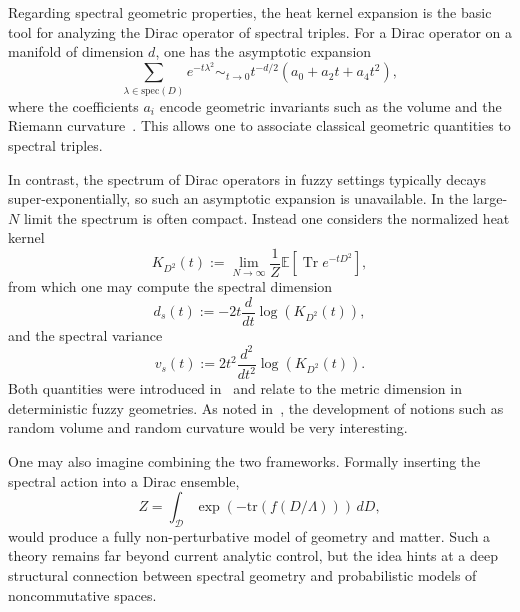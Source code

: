 \documentclass[11pt]{article}
\theoremstyle{plain}
\DeclareMathOperator{\tr}{Tr}
\begin{document}
\medskip

Regarding spectral geometric properties, the heat kernel expansion is the basic tool for
analyzing the Dirac operator of spectral triples.  
For a Dirac operator on a manifold of dimension $d$, one has the asymptotic expansion
\begin{equation*}
\sum_{\lambda \in \text{spec}(D)} e^{-t\lambda^2}
   \sim_{t \rightarrow 0} t^{-d/2}(a_{0}+a_{2}t + a_{4}t^2),
\end{equation*}
where the coefficients $a_i$ encode geometric invariants such as the volume and the
Riemann curvature~\cite{Gilkey}.  
This allows one to associate classical geometric quantities to spectral triples.

In contrast, the spectrum of Dirac operators in fuzzy settings typically decays
super-exponentially, so such an asymptotic expansion is unavailable.  
In the large-$N$ limit the spectrum is often compact.  
Instead one considers the normalized heat kernel
\begin{equation*}
K_{D^2}(t):=\lim_{N \rightarrow \infty}\frac{1}{Z}\mathbb{E}\!\left[\tr e^{-t D^2}\right],
\end{equation*}
from which one may compute the spectral dimension
\begin{equation*}
d_{s}(t) := -2t\frac{d}{dt}\log(K_{D^2}(t)),
\end{equation*}
and the spectral variance
\begin{equation*}
v_{s}(t) := 2t^2\frac{d^{2}}{dt^{2}}\log(K_{D^2}(t)).
\end{equation*}
Both quantities were introduced in~\cite{Spectral estimators} and relate to the metric
dimension in deterministic fuzzy geometries.  
As noted in~\cite{Spectral estimators}, the development of notions such as random volume and
random curvature would be very interesting.

\medskip

One may also imagine combining the two frameworks.  
Formally inserting the spectral action into a Dirac ensemble,
\[
Z = \int_{\mathcal{D}} \exp\!\left( - \mathrm{tr}(f(D/\Lambda)) \right)\, dD,
\]
would produce a fully non-perturbative model of geometry and matter.  
Such a theory remains far beyond current analytic control, but the idea hints at a deep
structural connection between spectral geometry and probabilistic models of
noncommutative spaces.

\medskip
\end{document}
